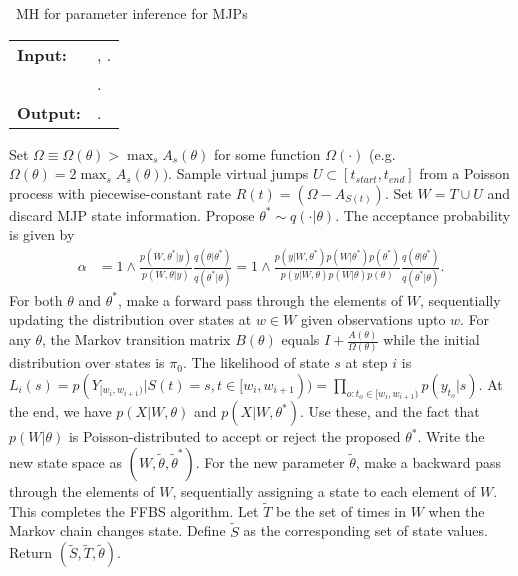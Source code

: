 \begin{algorithm}[H]
   \caption{\Naive\  MH for parameter inference for MJPs }
   \label{alg:MH_naive}
  \begin{tabular}{l l}
   \textbf{Input:  } & \text{The observations $X$}, 
                       \text{the previous MJP path $S(t) = (S, T)$ and parameters $\theta$}.\\ 
                     & \text{A  Metropolis-Hasting proposal $q(\cdot | \theta)$}.\\
   \textbf{Output:  }& \text{A new MJP trajectory $\tilde{S} (t) = (\tilde{S}, \tilde{T})$, 
                            new MJP parameters $\tilde{\theta}$}.\\
   \hline
   \end{tabular}
   \begin{algorithmic}[1]
     \State Set $\Omega \equiv \Omega(\theta) > \max_s{A_s(\theta)}$ for
     some function $\Omega(\cdot)$ (e.g.\ $\Omega(\theta) = 
      2\max_s A_s(\theta))$.
      \State Sample virtual jumps $U\subset[t_{start}, t_{end}]$ from a 
      Poisson process with piecewise-constant rate 
      $R(t) = (\Omega - A_{S(t)})$. 
    Set $W = T \cup U$ and discard MJP state information.
      \State Propose $\theta^* \sim q(\cdot| \theta)$.
          The acceptance probability is given by 
          \begin{align*}
          \alpha &=  1 \wedge \frac{p(W,\theta^*| y)}{p(W, \theta| y)} \frac{q(\theta|\theta^*)}{q(\theta^*|\theta)}
          =  1 \wedge \frac{p(y| W,\theta^*) p(W | \theta^*)p(\theta^*)}{p(y|W, \theta)p(W | \theta)p(\theta)} \frac{q(\theta|\theta^*)}{q(\theta^*|\theta)}.
          \end{align*}
    \State For both $\theta$ and $\theta^*$, make a forward pass through the 
    elements of $W$, sequentially updating the distribution over states at 
    $w \in W$ given observations upto $w$. 
    For any $\theta$, the Markov transition matrix 
    $B(\theta)$ equals $I + \frac{A(\theta)}{\Omega(\theta)}$ while the initial distribution
      over states is $\pi_0$. The likelihood of state $s$ at step $i$ is 
      $ L_i(s) = p(Y_{[w_i, w_{i + 1})} | S(t) = s , t \in [w_i, w_{i + 1})) = 
      \prod_{o: t_o \in [w_i, w_{i + 1})}p(y_{t_o} | s)$.
    At the end, we have 
    $p(X|W,\theta)$ and $p(X|W,\theta^*)$. Use these, and the fact that 
    $p(W|\theta)$ is Poisson-distributed to accept or reject the
    proposed $\theta^*$. Write the new state space
    as $(W,\tilde{\theta},\tilde{\theta}^*)$.
    \State For the new parameter $\tilde{\theta}$, make a backward pass through 
    the elements of
    $W$, sequentially assigning a state to each element of $W$. This
    completes the FFBS algorithm.
    \State Let $\tilde{T}$ be the set of times in $W$ when the Markov chain changes state. Define $\tilde{S}$ as the corresponding set of state values. Return $(\tilde{S}, \tilde{T}, \tilde{\theta})$.
\end{algorithmic}
\end{algorithm}
